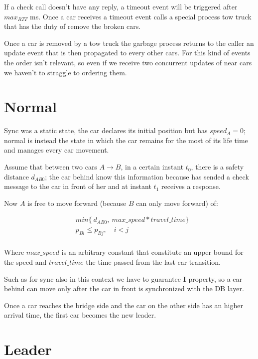 If a check call doesn't have any reply, a timeout event will be triggered after 
$max_{RTT}$ ms. Once a car receives a timeout event calls a special process 
tow truck that has the duty of remove the broken cars.  

Once a car is removed by a tow truck the garbage process returns to the caller 
an update event that is then propagated to every other cars. For this kind of events 
the order isn't relevant, so even if we receive two concurrent updates of near cars 
we haven't to straggle to ordering them.


\section{Normal}

Sync was a static state, the car declares its initial position but has $speed_A = 0$;
normal is instead the state in which the car remains for the most of its life time and 
manages every car movement.

Assume that between two cars $A \rightarrow B$, in a certain instant $t_0$, 
there is a safety distance $d_{AB0}$; 
the car behind know this information because has sended a check message to the car 
in front of her and at instant $t_1$ receives a response.

Now $A$ is free to move forward (because $B$ can only move forward) of:

\begin{equation}\begin{split}
    & min\{\ d_{AB0},\ max\_speed * travel\_time \} \\
    & p_{Bi} \leq p_{Bj},\quad i < j \\
\end{split}\end{equation}    

Where $max\_speed$ is an arbitrary constant that constitute an upper bound for the speed 
and $travel\_time$ the time passed from the last car transition. 

Such as for sync also in this context we have to guarantee \textbf{I} property, so 
a car behind can move only after the car in front is synchronized with the DB layer.

Once a car reaches the bridge side and the car on the other side has an 
higher arrival time, the first car becomes the new leader.


\section{Leader}

